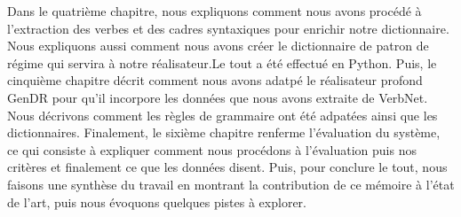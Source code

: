 Dans le quatrième chapitre, nous expliquons comment nous avons procédé à l'extraction des verbes et des cadres syntaxiques pour enrichir notre dictionnaire. Nous expliquons aussi comment nous avons créer le dictionnaire de patron de régime qui servira à notre réalisateur.Le tout a été effectué en Python. Puis, le cinquième chapitre décrit comment nous avons adatpé le réalisateur profond GenDR pour qu'il incorpore les données que nous avons extraite de VerbNet. Nous décrivons comment les règles de grammaire ont été adpatées ainsi que les dictionnaires. Finalement, le sixième chapitre renferme l'évaluation du système, ce qui consiste à expliquer comment nous procédons à l'évaluation puis nos critères et finalement ce que les données disent. Puis, pour conclure le tout, nous faisons une synthèse du travail en montrant la contribution de ce mémoire à l'état de l'art, puis nous évoquons quelques pistes à explorer.

